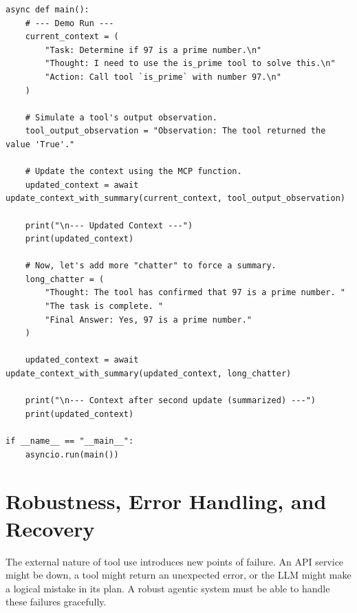 \begin{listing}
\begin{verbatim}
async def main():
    # --- Demo Run ---
    current_context = (
        "Task: Determine if 97 is a prime number.\n"
        "Thought: I need to use the is_prime tool to solve this.\n"
        "Action: Call tool `is_prime` with number 97.\n"
    )

    # Simulate a tool's output observation.
    tool_output_observation = "Observation: The tool returned the value 'True'."

    # Update the context using the MCP function.
    updated_context = await update_context_with_summary(current_context, tool_output_observation)

    print("\n--- Updated Context ---")
    print(updated_context)

    # Now, let's add more "chatter" to force a summary.
    long_chatter = (
        "Thought: The tool has confirmed that 97 is a prime number. "
        "The task is complete. "
        "Final Answer: Yes, 97 is a prime number."
    )

    updated_context = await update_context_with_summary(updated_context, long_chatter)

    print("\n--- Context after second update (summarized) ---")
    print(updated_context)

if __name__ == "__main__":
    asyncio.run(main())
\end{verbatim}
    \caption{Simplified implementation of the Model Context Protocol. (Part 2)}\label{lst:MCP2}
\end{listing}



\section{Robustness, Error Handling, and Recovery}
The external nature of tool use introduces new points of failure. An API service might be down, a tool might return an unexpected error, or the LLM might make a logical mistake in its plan. A robust agentic system must be able to handle these failures gracefully.

